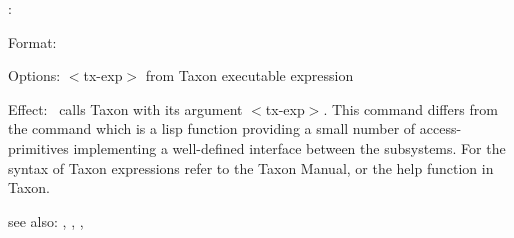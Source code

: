 \colab{} \tx:

Format: 

Options: $<$tx-exp$>$ from Taxon executable expression

Effect: \tx \ calls Taxon with its argument $<$tx-exp$>$.
        This command differs from the command 
        which is a lisp function providing a small number of 
        access-primitives implementing a well-defined interface between
	the \COLAB{} subsystems. For the syntax of Taxon expressions
	refer to the Taxon Manual, or the help function in Taxon.

see also: \col, \rf, \fw, \cn
